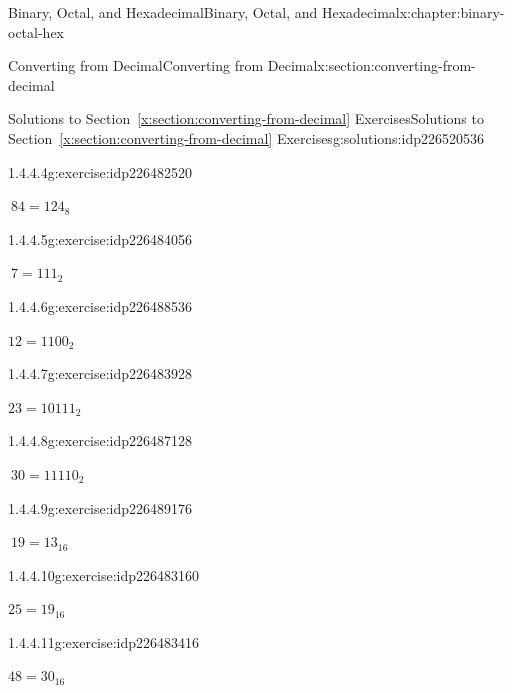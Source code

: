 \documentclass[twoside,10pt,]{book}
\newcommand{\xreffont}{\relax}
\numberwithin{equation}{section}
\begin{document}
\begin{chapterptx}{Binary, Octal, and Hexadecimal}{}{Binary, Octal, and Hexadecimal}{}{}{x:chapter:binary-octal-hex}
\begin{sectionptx}{Converting from Decimal}{}{Converting from Decimal}{}{}{x:section:converting-from-decimal}
\begin{solutions-subsection}{Solutions to Section~{\xreffont\ref*{x:section:converting-from-decimal}} Exercises}{}{Solutions to Section~{\xreffont\ref*{x:section:converting-from-decimal}} Exercises}{}{}{g:solutions:idp226520536}
\begin{exercisegroup}
\begin{divisionsolutioneg}{1.4.4.4}{}{g:exercise:idp226482520}%
\par\smallskip%
\noindent\hypertarget{g:solution:idp226485336-main}{}\(\ 84=124_8\)\end{divisionsolutioneg}%
\end{exercisegroup}
\par\medskip\noindent
\begin{exercisegroup}
\begin{divisionsolutioneg}{1.4.4.5}{}{g:exercise:idp226484056}%
\par\smallskip%
\noindent\hypertarget{g:solution:idp226489560-main}{}\(\ 7=111_2\)\end{divisionsolutioneg}%
\begin{divisionsolutioneg}{1.4.4.6}{}{g:exercise:idp226488536}%
\par\smallskip%
\noindent\hypertarget{g:solution:idp226490200-main}{}\(12=1100_2\)\end{divisionsolutioneg}%
\begin{divisionsolutioneg}{1.4.4.7}{}{g:exercise:idp226483928}%
\par\smallskip%
\noindent\hypertarget{g:solution:idp226486744-main}{}\(23=10111_2\)\end{divisionsolutioneg}%
\begin{divisionsolutioneg}{1.4.4.8}{}{g:exercise:idp226487128}%
\par\smallskip%
\noindent\hypertarget{g:solution:idp226489944-main}{}\(\ 30=11110_2\)\end{divisionsolutioneg}%
\end{exercisegroup}
\par\medskip\noindent
\begin{exercisegroup}
\begin{divisionsolutioneg}{1.4.4.9}{}{g:exercise:idp226489176}%
\par\smallskip%
\noindent\hypertarget{g:solution:idp226490328-main}{}\(\ 19=13_{16}\)\end{divisionsolutioneg}%
\begin{divisionsolutioneg}{1.4.4.10}{}{g:exercise:idp226483160}%
\par\smallskip%
\noindent\hypertarget{g:solution:idp226485080-main}{}\(25=19_{16}\)\end{divisionsolutioneg}%
\begin{divisionsolutioneg}{1.4.4.11}{}{g:exercise:idp226483416}%
\par\smallskip%
\noindent\hypertarget{g:solution:idp226490840-main}{}\(48=30_{16}\)\end{divisionsolutioneg}%

\end{exercisegroup}
\end{solutions-subsection}
\end{sectionptx}
\end{chapterptx}
\end{document}
